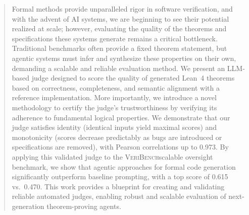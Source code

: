 \begin{abstract}
  Formal methods provide unparalleled rigor in software verification, and with the advent of AI systems, we are beginning to see their potential realized at scale; however, evaluating the quality of the theorems and specifications these systems generate remains a critical bottleneck.
  Traditional benchmarks often provide a fixed theorem statement, but agentic systems must infer and synthesize these properties on their own, demanding a scalable and reliable evaluation method.
  We present an LLM-based judge designed to score the quality of generated Lean~4 theorems based on correctness, completeness, and semantic alignment with a reference implementation.
  More importantly, we introduce a novel methodology to certify the judge's trustworthiness by verifying its adherence to fundamental logical properties.
  We demonstrate that our judge satisfies identity (identical inputs yield maximal scores) and monotonicity (scores decrease predictably as bugs are introduced or specifications are removed), with Pearson correlations up to 0.973.
  By applying this validated judge to the \textsc{VeriBench}\citep{veribench_icml25}scalable oversight benchmark, we show that agentic approaches for formal code generation significantly outperform baseline prompting, with a top score of 0.615 vs.\ 0.470.
  This work provides a blueprint for creating and validating reliable automated judges, enabling robust and scalable evaluation of next-generation theorem-proving agents.
\end{abstract}